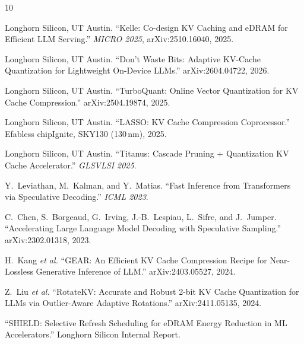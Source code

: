 \documentclass[conference]{IEEEtran}
\begin{document}
\begin{thebibliography}{10}

Longhorn Silicon, UT Austin.
``Kelle: Co-design KV Caching and eDRAM for Efficient LLM Serving.''
\emph{MICRO 2025}, arXiv:2510.16040, 2025.

Longhorn Silicon, UT Austin.
``Don't Waste Bits: Adaptive KV-Cache Quantization for Lightweight On-Device LLMs.''
arXiv:2604.04722, 2026.

Longhorn Silicon, UT Austin.
``TurboQuant: Online Vector Quantization for KV Cache Compression.''
arXiv:2504.19874, 2025.

Longhorn Silicon, UT Austin.
``LASSO: KV Cache Compression Coprocessor.''
Efabless chipIgnite, SKY130 (130\,nm), 2025.

Longhorn Silicon, UT Austin.
``Titanus: Cascade Pruning + Quantization KV Cache Accelerator.''
\emph{GLSVLSI 2025}.

Y.~Leviathan, M.~Kalman, and Y.~Matias.
``Fast Inference from Transformers via Speculative Decoding.''
\emph{ICML 2023}.

C.~Chen, S.~Borgeaud, G.~Irving, J.-B.~Lespiau, L.~Sifre, and J.~Jumper.
``Accelerating Large Language Model Decoding with Speculative Sampling.''
arXiv:2302.01318, 2023.

H.~Kang \emph{et al.}
``GEAR: An Efficient KV Cache Compression Recipe for Near-Lossless Generative
Inference of LLM.''
arXiv:2403.05527, 2024.

Z.~Liu \emph{et al.}
``RotateKV: Accurate and Robust 2-bit KV Cache Quantization for LLMs via
Outlier-Aware Adaptive Rotations.''
arXiv:2411.05135, 2024.

``SHIELD: Selective Refresh Scheduling for eDRAM Energy Reduction in ML
Accelerators.''
Longhorn Silicon Internal Report.

\end{thebibliography}
\end{document}
